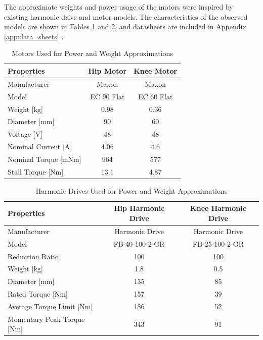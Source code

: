 The approximate weights and power usage of the motors were inspired by existing harmonic drive and motor models. The characteristics of the observed models are shown in Tables \ref{tab:motors} and \ref{tab:HDs}, and datasheets are included in Appendix \ref{app:data_sheets}\cite{harmonic_drive_csd-2a_nodate} \cite{maxon_motor_ec60_nodate}.

\begin{table}[H]
    \centering
    \caption{Motors Used for Power and Weight Approximations}
    \label{tab:motors}
    \begin{tabular}{l c c}
        \\ \hline
        \textbf{Properties} & \textbf{Hip Motor} & \textbf{Knee Motor}
        \\ \hline
        Manufacturer & Maxon & Maxon
        \\
        Model & EC 90 Flat & EC 60 Flat
        \\
        Weight [kg] & 0.98 & 0.36
        \\
        Diameter [mm] & 90 & 60 
        \\
        Voltage [V] & 48 & 48
        \\
        Nominal Current [A] & 4.06 & 4.6
        \\
        Nominal Torque [mNm] & 964 & 577
        \\
        Stall Torque [Nm] & 13.1 & 4.87
        \\ \hline
    \end{tabular}
\end{table}

\begin{table}[H]
    \centering
    \caption{Harmonic Drives Used for Power and Weight Approximations}
    \label{tab:HDs}
    \begin{tabular}{l c c}
        \\ \hline
        \textbf{Properties} & \textbf{Hip Harmonic Drive} & \textbf{Knee Harmonic Drive}
        \\ \hline
        Manufacturer & Harmonic Drive & Harmonic Drive
        \\
        Model & FB-40-100-2-GR & 	FB-25-100-2-GR 
        \\
        Reduction Ratio & 100 & 100
        \\
        Weight [kg] & 1.8 & 0.5 
        \\
        Diameter [mm] & 135 & 85 
        \\
        Rated Torque [Nm] & 157 & 39
        \\
        Average Torque Limit [Nm] & 186 & 52
        \\
        Momentary Peak Torque [Nm] & 343 & 91
        \\ \hline
    \end{tabular}
\end{table}

